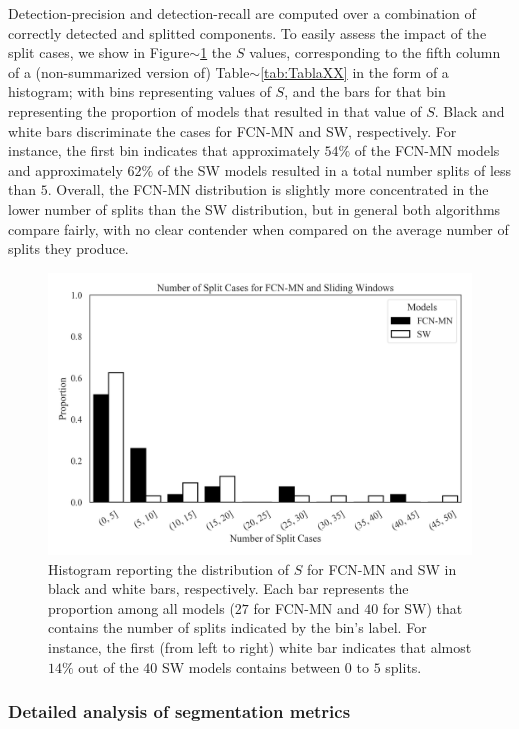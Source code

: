 \documentclass[a4paper,authoryear,review]{elsarticle}
\begin{document}
	
	Detection-precision and detection-recall are computed over a combination of correctly detected and splitted components. To easily assess the impact of the split cases, we show in Figure$\sim$\ref{fig:number-of-split} the $S$ values, corresponding to the fifth column of a   (non-summarized version of) Table$\sim$\ref{tab:TablaXX} in the form of a histogram; with bins representing values of $S$,  and the bars for that bin representing the proportion of models that resulted in that value of $S$. Black and white bars discriminate the cases for FCN-MN and SW, respectively. For instance, the first bin indicates that approximately $54\%$ of the FCN-MN models and approximately $62\%$ of the SW models resulted in a total number splits of less than $5$. Overall, the FCN-MN distribution is slightly more concentrated in the lower number of splits than the SW distribution, but in general both algorithms compare fairly, with no clear contender when compared on the average number of splits they produce. 
	
	
	\begin{figure}
		\centering
		\includegraphics[width=\textwidth]{figures/PPP_split_distribution.png}
		\caption{Histogram reporting the distribution of $S$ for FCN-MN and SW in black and white bars, respectively. Each bar represents the proportion among all models ($27$ for FCN-MN  and $40$ for SW) that contains the number of splits indicated by the bin’s label. For instance, the first (from left to right) white bar indicates that almost $14\%$ out of the $40$ SW models contains between $0$ to $5$ splits. }
		\label{fig:number-of-split}
	\end{figure}
	
	
	\subsubsection{Detailed analysis of segmentation metrics}
	
\end{document}
